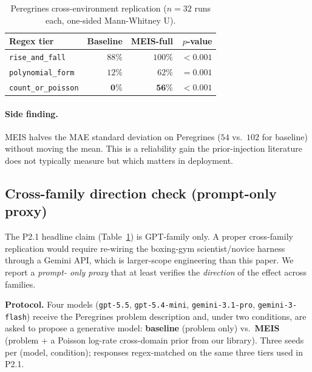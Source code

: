 \documentclass{article}
\begin{document}
\begin{table}[h]
\centering
\caption{Peregrines cross-environment replication ($n = 32$ runs each,
one-sided Mann-Whitney U).}
\label{tab:crossenv}
\begin{tabular}{lrrr}
\toprule
Regex tier               & Baseline & MEIS-full & $p$-value \\
\midrule
\texttt{rise\_and\_fall}       & $88\%$ & $100\%$ & $< 0.001$ \\
\texttt{polynomial\_form}      & $12\%$ & $62\%$  & $= 0.001$ \\
\texttt{count\_or\_poisson}    & $\mathbf{0\%}$ & $\mathbf{56\%}$ & $\mathbf{< 0.001}$ \\
\bottomrule
\end{tabular}
\end{table}

\paragraph{Side finding.} MEIS halves the MAE standard deviation
on Peregrines ($54$ vs.\ $102$ for baseline) without moving the
mean. This is a reliability gain the prior-injection literature
does not typically measure but which matters in deployment.

\subsection{Cross-family direction check (prompt-only proxy)}
\label{sec:exp-crossfamily-proxy}

The P2.1 headline claim (Table~\ref{tab:crossenv}) is GPT-family only.
A proper cross-family replication would require re-wiring the
boxing-gym scientist/novice harness through a Gemini API, which is
larger-scope engineering than this paper. We report a \emph{prompt-
only proxy} that at least verifies the \emph{direction} of the
effect across families.

\textbf{Protocol.} Four models (\texttt{gpt-5.5},
\texttt{gpt-5.4-mini}, \texttt{gemini-3.1-pro}, \texttt{gemini-3-flash})
receive the Peregrines problem description and, under two conditions,
are asked to propose a generative model:
\textbf{baseline} (problem only) vs.\ \textbf{MEIS}
(problem + a Poisson log-rate cross-domain prior from our library).
Three seeds per (model, condition); responses regex-matched on the
same three tiers used in P2.1.
\end{document}
